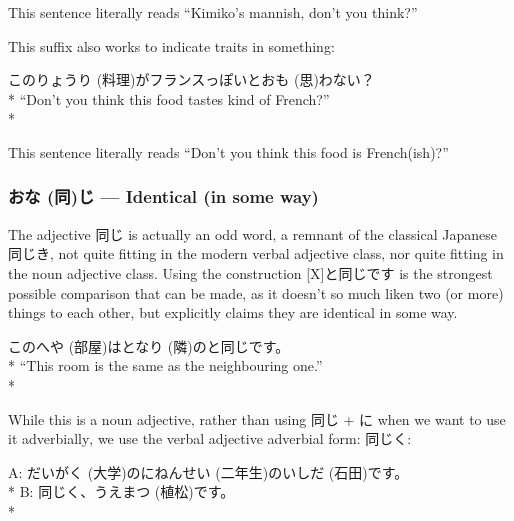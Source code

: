 \documentclass[11pt, b5paper, twoside, openright, onecolumn]{book}
\makeatletter
\newcommand*{\rubystack}[2]{{\relscale{0.5}%
  \begin{tabular}[b]{@{}c@{}}%
    {#1}\\%
   {\textscale{2}{#2}}%
  \end{tabular}}%
}
\DeclareRobustCommand*{\ruby}[2]{%
  \mbox{%
    \setlength{\parskip}{0ex}%
    \BeginAccSupp{method=pdfstringdef,ActualText={#1}}%
      \rubystack{\phantom{#2}}{#1}%
      \llap{%
        \rubystack{#2}{\phantom{#1}}%
      }%
    \EndAccSupp{}%
  }%
}
\renewcommand*{\ruby}[2]{#2 (#1)}%
\newenvironment{exampleblock}{
\setlength{\parindent}{0.6in}
\begin{minipage}[t]{\dimexpr\textwidth-\parindent}}
{\end{minipage}}
\makeatother
\begin{document}
This sentence literally reads “Kimiko’s mannish‚ don’t you think?”

This suffix also works to indicate traits in something:

\vspace{0.4cm}
\begin{exampleblock}
この\ruby{料理}{りょうり}がフランスっぽいと\ruby{思}{おも}わない？ \\* 
“Don’t you think this food tastes kind of French?” \\* 
\end{exampleblock}
\vspace{0.2cm}

This sentence literally reads “Don’t you think this food is French(ish)?”

\subsubsection{\ruby{同}{おな}じ — Identical (in some way)}

The adjective 同じ is actually an odd word‚ a remnant of the classical Japanese 同じき‚ not quite fitting in the modern verbal adjective class‚ nor quite fitting in the noun adjective class. Using the construction [X]と同じです is the strongest possible comparison that can be made‚ as it doesn’t so much liken two (or more) things to each other‚ but explicitly claims they are identical in some way.

\vspace{0.4cm}
\begin{exampleblock}
この\ruby{部屋}{へや}は\ruby{隣}{となり}のと同じです。 \\* 
“This room is the same as the neighbouring one.” \\* 
\end{exampleblock}
\vspace{0.2cm}

While this is a noun adjective‚ rather than using 同じ + に when we want to use it adverbially‚ we use the verbal adjective adverbial form: 同じく:

\vspace{0.4cm}
\begin{exampleblock}
A: \ruby{大学}{だいがく}の\ruby{二年生}{にねんせい}の\ruby{石田}{いしだ}です。 \\* 
B: 同じく、\ruby{植松}{うえまつ}です。 \\* 
\end{exampleblock}
\vspace{0.2cm}
\end{document}
